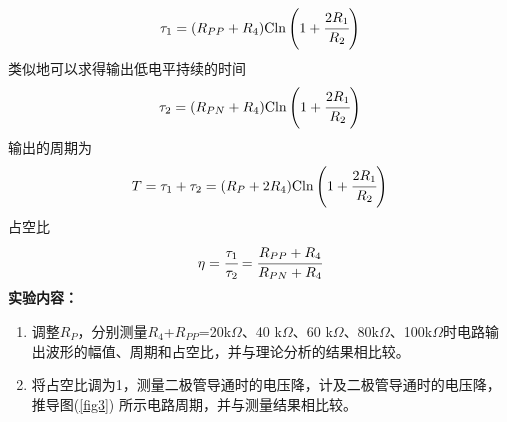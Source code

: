 \documentclass[a4paper]{article}
\begin{document}
\begin{equation}
\tau_1 = (R_{PP}+R_4)\text{C}\text{ln}\left(1+\cfrac{2R_1}{R_2}\right)\label{eq4}
\end{equation}
类似地可以求得输出低电平持续的时间
\begin{equation}
\tau_2 = (R_{PN}+R_4)\text{C}\text{ln}\left(1+\cfrac{2R_1}{R_2}\right)\label{eq5}
\end{equation}
输出的周期为
\begin{equation}
T = \tau_1+\tau_2 = (R_P+2R_4)\text{C}\text{ln}\left(1+\cfrac{2R_1}{R_2}\right)\label{eq6}
\end{equation}
占空比
\begin{equation}
\eta = \cfrac{\tau_1}{\tau_2} = \cfrac{R_{PP}+R_4}{R_{PN}+R_4}\label{eq7}
\end{equation}
\textbf{实验内容：}
\begin{enumerate}
\item 调整$R_P$，分别测量$R_4$+$R_{PP}$=20k$\Omega$、40 k$\Omega$、60 k$\Omega$、80k$\Omega$、100k$\Omega$时电路输出波形的幅值、周期和占空比，并与理论分析的结果相比较。
\item 将占空比调为1，测量二极管导通时的电压降，计及二极管导通时的电压降，推导图(\ref{fig3}) 所示电路周期，并与测量结果相比较。
\end{enumerate}
\end{document}
